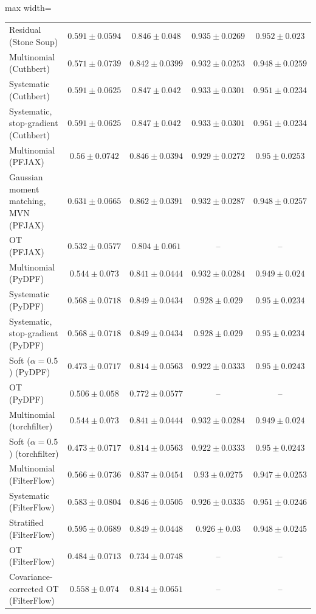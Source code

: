 \begin{table}[H]
\begin{adjustbox}{max width=\linewidth}
\begin{tabular}{lcccc}
Residual (Stone Soup) & $0.591\pm0.0594$ & $0.846\pm0.048$ & $\mathbf{0.935\pm0.0269}$ & $0.952\pm0.023$ \\
Multinomial (Cuthbert) & $0.571\pm0.0739$ & $0.842\pm0.0399$ & $0.932\pm0.0253$ & $0.948\pm0.0259$ \\
Systematic (Cuthbert) & $0.591\pm0.0625$ & $0.847\pm0.042$ & $0.933\pm0.0301$ & $0.951\pm0.0234$ \\
Systematic, stop-gradient (Cuthbert) & $0.591\pm0.0625$ & $0.847\pm0.042$ & $0.933\pm0.0301$ & $0.951\pm0.0234$ \\
Multinomial (PFJAX) & $0.56\pm0.0742$ & $0.846\pm0.0394$ & $0.929\pm0.0272$ & $0.95\pm0.0253$ \\
Gaussian moment matching, MVN (PFJAX) & $\mathbf{0.631\pm0.0665}$ & $\mathbf{0.862\pm0.0391}$ & $0.932\pm0.0287$ & $0.948\pm0.0257$ \\
OT (PFJAX) & $0.532\pm0.0577$ & $0.804\pm0.061$ & -- & -- \\
Multinomial (PyDPF) & $0.544\pm0.073$ & $0.841\pm0.0444$ & $0.932\pm0.0284$ & $0.949\pm0.024$ \\
Systematic (PyDPF) & $0.568\pm0.0718$ & $0.849\pm0.0434$ & $0.928\pm0.029$ & $0.95\pm0.0234$ \\
Systematic, stop-gradient (PyDPF) & $0.568\pm0.0718$ & $0.849\pm0.0434$ & $0.928\pm0.029$ & $0.95\pm0.0234$ \\
Soft ($\alpha{=}0.5$) (PyDPF) & $0.473\pm0.0717$ & $0.814\pm0.0563$ & $0.922\pm0.0333$ & $\mathbf{0.95\pm0.0243}$ \\
OT (PyDPF) & $0.506\pm0.058$ & $0.772\pm0.0577$ & -- & -- \\
Multinomial (torchfilter) & $0.544\pm0.073$ & $0.841\pm0.0444$ & $0.932\pm0.0284$ & $0.949\pm0.024$ \\
Soft ($\alpha{=}0.5$) (torchfilter) & $0.473\pm0.0717$ & $0.814\pm0.0563$ & $0.922\pm0.0333$ & $\mathbf{0.95\pm0.0243}$ \\
Multinomial (FilterFlow) & $0.566\pm0.0736$ & $0.837\pm0.0454$ & $0.93\pm0.0275$ & $0.947\pm0.0253$ \\
Systematic (FilterFlow) & $0.583\pm0.0804$ & $0.846\pm0.0505$ & $0.926\pm0.0335$ & $0.951\pm0.0246$ \\
Stratified (FilterFlow) & $0.595\pm0.0689$ & $0.849\pm0.0448$ & $0.926\pm0.03$ & $0.948\pm0.0245$ \\
OT (FilterFlow) & $0.484\pm0.0713$ & $0.734\pm0.0748$ & -- & -- \\
Covariance-corrected OT (FilterFlow) & $0.558\pm0.074$ & $0.814\pm0.0651$ & -- & -- \\

\end{tabular}
\end{adjustbox}
\end{table}
